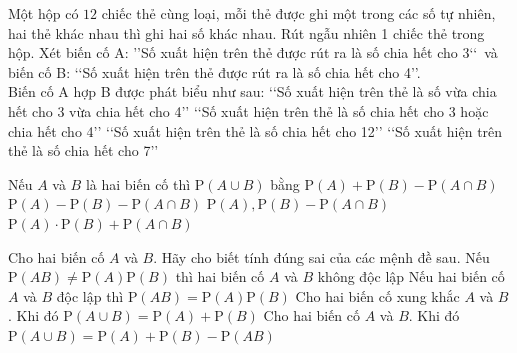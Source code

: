 \begin{ex}%
	Một hộp có $12$ chiếc thẻ cùng loại, mỗi thẻ được ghi một trong các số tự nhiên,  hai thẻ khác nhau thì ghi hai số khác nhau. Rút ngẫu nhiên 1 chiếc thẻ trong hộp. Xét biến cố A: \rq\rq Số xuất hiện trên thẻ được rút ra là số chia hết cho 3\lq\lq\, và biến cố B: \lq\lq Số xuất hiện trên thẻ được rút ra là số chia hết cho 4\rq\rq.\\
	Biến cố A  hợp B được phát biểu như sau:
	 \choice
		{\lq\lq Số xuất hiện trên thẻ là số vừa chia hết cho 3 vừa chia hết cho 4\rq\rq  }
		{\True \lq\lq Số xuất hiện trên thẻ là số chia hết cho 3 hoặc chia  hết cho 4\rq\rq }
		{\lq\lq Số xuất hiện  trên thẻ là số chia hết cho 12\rq\rq }
		{\lq\lq Số xuất hiện trên thẻ  là số chia hết cho 7\rq\rq }
\end{ex}

\begin{ex}%
	Nếu $A$ và $B$  là hai biến cố thì $\mathrm{P}(A \cup B)$ bằng
	\choice 
		{\True  $\mathrm{P}(A)+\mathrm{P}(B)-\mathrm{P}(A \cap B)$}
		 {$\mathrm{P}(A)-\mathrm{P}(B)-\mathrm{P}(A \cap B)$}
		 {$\mathrm{P}(A), \mathrm{P}(B)-\mathrm{P}(A \cap B)$}
		{$\mathrm{P}(A)  \cdot \mathrm{P}(B)+\mathrm{P}(A \cap B)$}
\end{ex}



\begin{ex}%
 Cho hai biến cố $A$ và $B$. Hãy cho biết tính đúng sai của các mệnh  đề sau.
  \choiceTF
  {\True Nếu $\mathrm{P}(A  B) \neq \mathrm{P}(A) \mathrm{P}(B)$ thì hai biến cố $A$ và $B$ không độc lập}
  {\True Nếu hai biến cố $A$ và $B$ độc lập thì  $\mathrm{P}(A B)=\mathrm{P}(A) \mathrm{P}(B)$}
  {\True Cho hai biến cố xung khắc $A$ và  $B$. Khi đó $\mathrm{P}(A \cup B)=\mathrm{P}(A)+\mathrm{P}(B)$}
  {\True  Cho hai biến cố $A$ và $B$. Khi đó $\mathrm{P}(A \cup B)=\mathrm{P}(A)+\mathrm{P}(B)-\mathrm{P}(A B)$}
\end{ex}

